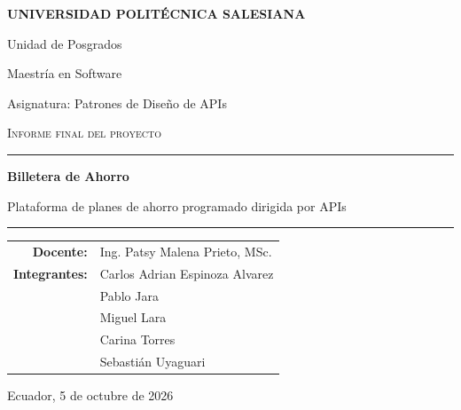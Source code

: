 \begin{titlepage}
\centering
\color{azulups}
{\Large\bfseries UNIVERSIDAD POLITÉCNICA SALESIANA\par}
\vspace{4pt}
{\large Unidad de Posgrados\par}
{\large Maestría en Software\par}
\vspace{1.6cm}
{\normalcolor\large Asignatura: Patrones de Diseño de APIs\par}
\vspace{2.2cm}
{\normalcolor\large\scshape Informe final del proyecto\par}
\vspace{0.6cm}
\rule{0.85\linewidth}{0.8pt}\par
\vspace{0.4cm}
{\Huge\bfseries Billetera de Ahorro\par}
\vspace{0.3cm}
{\Large Plataforma de planes de ahorro programado dirigida por APIs\par}
\vspace{0.4cm}
\rule{0.85\linewidth}{0.8pt}\par
\vfill
\normalcolor
\begin{tabular}{@{}rl@{}}
\textbf{Docente:} & Ing. Patsy Malena Prieto, MSc. \\[4pt]
\textbf{Integrantes:} & Carlos Adrian Espinoza Alvarez \\[4pt]
 & Pablo Jara \\[4pt]
 & Miguel Lara \\[4pt]
 & Carina Torres \\[4pt]
 & Sebastián Uyaguari \\
\end{tabular}
\vfill
{\large Ecuador, 5 de octubre de 2026\par}
\end{titlepage}

